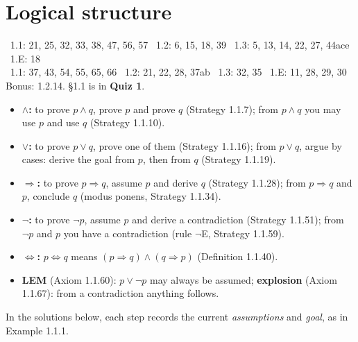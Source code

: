 \chapter{Logical structure}
%
{\fE\ 1.1: 21, 25, 32, 33, 38, 47, 56, 57 \textperiodcentered\ 1.2: 6, 15, 18, 39 \textperiodcentered\ 1.3: 5, 13, 14, 22, 27, 44ace \textperiodcentered\ 1.E: 18\\ \fR\ 1.1: 37, 43, 54, 55, 65, 66 \textperiodcentered\ 1.2: 21, 22, 28, 37ab \textperiodcentered\ 1.3: 32, 35 \textperiodcentered\ 1.E: 11, 28, 29, 30\\ Bonus: 1.2.14. \S1.1 is in \textbf{Quiz 1}.}


\begin{key}
\begin{itemize}
\item \textbf{$\wedge$:} to prove $p\wedge q$, prove $p$ and prove $q$ (Strategy 1.1.7); from $p\wedge q$ you may use $p$ and use $q$ (Strategy 1.1.10).
\item \textbf{$\vee$:} to prove $p\vee q$, prove one of them (Strategy 1.1.16); from $p\vee q$, argue by cases: derive the goal from $p$, then from $q$ (Strategy 1.1.19).
\item \textbf{$\Rightarrow$:} to prove $p\Rightarrow q$, assume $p$ and derive $q$ (Strategy 1.1.28); from $p\Rightarrow q$ and $p$, conclude $q$ (modus ponens, Strategy 1.1.34).
\item \textbf{$\neg$:} to prove $\neg p$, assume $p$ and derive a contradiction (Strategy 1.1.51); from $\neg p$ and $p$ you have a contradiction (rule $\neg$E, Strategy 1.1.59).
\item \textbf{$\Leftrightarrow$:} $p\Leftrightarrow q$ means $(p\Rightarrow q)\wedge(q\Rightarrow p)$ (Definition 1.1.40).
\item \textbf{LEM} (Axiom 1.1.60): $p\vee\neg p$ may always be assumed; \textbf{explosion} (Axiom 1.1.67): from a contradiction anything follows.
\end{itemize}
In the solutions below, each step records the current \emph{assumptions} and \emph{goal}, as in Example 1.1.1.
\end{key}

